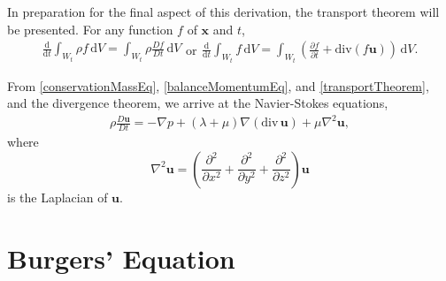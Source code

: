 \documentclass[undefended]{sfuthesis}
\begin{document}
In preparation for the final aspect of this derivation, the transport theorem will be presented. For any function $f$ of $\textbf{x}$ and $t$,
\begin{subequations}
	\label{transportTheorem}
	\begin{align}
	\frac{\mathrm{d}}{\mathrm{d} t} \int_{W_t} \rho f \,\mathrm{d} V = \int_{W_t} \rho \frac{D f}{D t} \,\mathrm{d} V
	\end{align}
	\text{or}
	\begin{align}
	\frac{\mathrm{d}}{\mathrm{d} t} \int_{W_t}  f \,\mathrm{d} V = \int_{W_t} \left(\frac{\partial f}{\partial t} + \mathrm{div} (f \textbf{u})\right) \,\mathrm{d} V.
	\end{align}
\end{subequations}

From \eqref{conservationMassEq}, \eqref{balanceMomentumEq}, and \eqref{transportTheorem}, and the divergence theorem, we arrive at the Navier-Stokes equations,
\begin{align}
\rho \frac{D\textbf{u}}{Dt} = - \nabla p + (\lambda + \mu) \nabla (\textrm{div} \,\textbf{u}) + \mu \nabla^2 \textbf{u}, \label{navierStokesEq}
\end{align}
where \[\nabla^2 \textbf{u} = \left( \frac{\partial^2}{\partial x^2} + \frac{\partial^2}{\partial y^2} + \frac{\partial^2}{\partial z^2} \right) \textbf{u}\] is the Laplacian of $\textbf{u}$.

\chapter{Burgers' Equation}
\label{sec:burgersEq}
\end{document}

